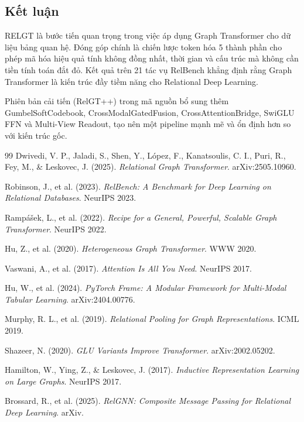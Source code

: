 \documentclass[12pt,a4paper]{article}
\begin{document}
\subsection{Kết luận}

RELGT là bước tiến quan trọng trong việc áp dụng Graph Transformer cho dữ liệu
bảng quan hệ. Đóng góp chính là chiến lược token hóa 5 thành phần cho phép
mã hóa hiệu quả tính không đồng nhất, thời gian và cấu trúc mà không cần
tiền tính toán đắt đỏ. Kết quả trên 21 tác vụ RelBench khẳng định rằng
Graph Transformer là kiến trúc đầy tiềm năng cho Relational Deep Learning.

Phiên bản cải tiến (RelGT++) trong mã nguồn bổ sung thêm GumbelSoftCodebook,
CrossModalGatedFusion, CrossAttentionBridge, SwiGLU FFN và Multi-View Readout,
tạo nên một pipeline mạnh mẽ và ổn định hơn so với kiến trúc gốc.

\begin{thebibliography}{99}
Dwivedi, V. P., Jaladi, S., Shen, Y., López, F., Kanatsoulis, C. I., Puri, R., Fey, M., \& Leskovec, J. (2025).
\textit{Relational Graph Transformer}.
arXiv:2505.10960.

Robinson, J., et al. (2023).
\textit{RelBench: A Benchmark for Deep Learning on Relational Databases}.
NeurIPS 2023.

Rampášek, L., et al. (2022).
\textit{Recipe for a General, Powerful, Scalable Graph Transformer}.
NeurIPS 2022.

Hu, Z., et al. (2020).
\textit{Heterogeneous Graph Transformer}.
WWW 2020.

Vaswani, A., et al. (2017).
\textit{Attention Is All You Need}.
NeurIPS 2017.

Hu, W., et al. (2024).
\textit{PyTorch Frame: A Modular Framework for Multi-Modal Tabular Learning}.
arXiv:2404.00776.

Murphy, R. L., et al. (2019).
\textit{Relational Pooling for Graph Representations}.
ICML 2019.

Shazeer, N. (2020).
\textit{GLU Variants Improve Transformer}.
arXiv:2002.05202.

Hamilton, W., Ying, Z., \& Leskovec, J. (2017).
\textit{Inductive Representation Learning on Large Graphs}.
NeurIPS 2017.

Brossard, R., et al. (2025).
\textit{RelGNN: Composite Message Passing for Relational Deep Learning}.
arXiv.
\end{thebibliography}
\end{document}
